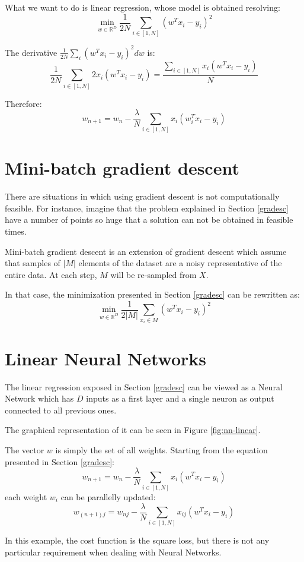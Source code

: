 What we want to do is linear regression, whose model is obtained resolving:
$$\displaystyle \min_{w \in \mathbb{R}^D} \frac{1}{2N} \sum_{i \in [1, N]} (w^T x_i - y_i)^2$$

The derivative  $\frac{1}{2N} \sum_i (w^T x_i - y_i)^2 dw$ is:
$$\frac{1}{2N} \sum_{i \in [1, N]} 2 x_i(w^T x_i - y_i) = \frac{\sum_{i \in [1, N]} x_i(w^T x_i - y_i)}{N}$$

Therefore:
$$ w_{n+1} = w_n - \frac{\lambda}{N} \sum_{i \in [1, N]} x_i(w_i^T x_i - y_i) $$


\section{Mini-batch gradient descent}
There are situations in which using gradient descent is not computationally feasible.
For instance, imagine that the problem explained in Section \ref{gradesc} have
a number of points so huge that a solution can not be obtained in feasible times.

Mini-batch gradient descent is an extension of gradient descent which assume that
samples of $|M|$ elements of the dataset are a noisy representative of the entire data.
At each step, $M$ will be re-sampled from $X$.

In that case, the minimization presented in Section \ref{gradesc} can be rewritten as:
$$\displaystyle \min_{w \in \mathbb{R}^D} \frac{1}{2|M|} \sum_{x_i \in M} (w^T x_i - y_i)^2 $$

\section{Linear Neural Networks}
The linear regression exposed in Section \ref{gradesc} can be viewed as a Neural Network
which has $D$ inputs as a first layer and a single neuron as output connected to all previous ones.

The graphical representation of it can be seen in Figure \ref{fig:nn-linear}.

The vector $w$ is simply the set of all weights.
Starting from the equation presented in Section \ref{gradesc}:
$$ w_{n+1} = w_n - \frac{\lambda}{N} \sum_{i \in [1, N]} x_i(w^T x_i - y_i) $$
each weight $w_i$ can be parallelly updated:
$$ w_{(n+1)j} = w_{nj} -  \frac{\lambda}{N} \sum_{i \in [1, N]} x_{ij}(w^T x_i - y_i) $$

In this example, the cost function is the square loss, but there is not any particular requirement when
dealing with Neural Networks.

